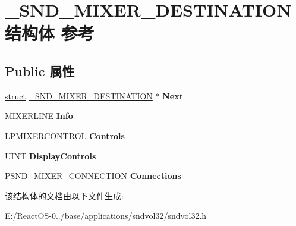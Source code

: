 \hypertarget{struct___s_n_d___m_i_x_e_r___d_e_s_t_i_n_a_t_i_o_n}{}\section{\+\_\+\+S\+N\+D\+\_\+\+M\+I\+X\+E\+R\+\_\+\+D\+E\+S\+T\+I\+N\+A\+T\+I\+O\+N结构体 参考}
\label{struct___s_n_d___m_i_x_e_r___d_e_s_t_i_n_a_t_i_o_n}
\subsection*{Public 属性}
\begin{DoxyCompactItemize}
\item 
\mbox{\label{struct___s_n_d___m_i_x_e_r___d_e_s_t_i_n_a_t_i_o_n_a4ad892b60f36f6779ee070a9ad213b46}} 
\hyperlink{interfacestruct}{struct} \hyperlink{struct___s_n_d___m_i_x_e_r___d_e_s_t_i_n_a_t_i_o_n}{\+\_\+\+S\+N\+D\+\_\+\+M\+I\+X\+E\+R\+\_\+\+D\+E\+S\+T\+I\+N\+A\+T\+I\+ON} $\ast$ {\bfseries Next}
\item 
\mbox{\label{struct___s_n_d___m_i_x_e_r___d_e_s_t_i_n_a_t_i_o_n_aca2514b644de46385f0bb59deeb73cd8}} 
\hyperlink{structtag_m_i_x_e_r_l_i_n_e_a}{M\+I\+X\+E\+R\+L\+I\+NE} {\bfseries Info}
\item 
\mbox{\label{struct___s_n_d___m_i_x_e_r___d_e_s_t_i_n_a_t_i_o_n_a02c4f4b3ea4935bb3aa35de07b2a200f}} 
\hyperlink{structtag_m_i_x_e_r_c_o_n_t_r_o_l_a}{L\+P\+M\+I\+X\+E\+R\+C\+O\+N\+T\+R\+OL} {\bfseries Controls}
\item 
\mbox{\label{struct___s_n_d___m_i_x_e_r___d_e_s_t_i_n_a_t_i_o_n_aedf248652bb9312c7371f881c60b5339}} 
U\+I\+NT {\bfseries Display\+Controls}
\item 
\mbox{\label{struct___s_n_d___m_i_x_e_r___d_e_s_t_i_n_a_t_i_o_n_a54f6f45a352ce1783a020c6503927f8c}} 
\hyperlink{struct___s_n_d___m_i_x_e_r___c_o_n_n_e_c_t_i_o_n}{P\+S\+N\+D\+\_\+\+M\+I\+X\+E\+R\+\_\+\+C\+O\+N\+N\+E\+C\+T\+I\+ON} {\bfseries Connections}
\end{DoxyCompactItemize}


该结构体的文档由以下文件生成\+:\begin{DoxyCompactItemize}
\item 
E\+:/\+React\+O\+S-\/0../base/applications/sndvol32/sndvol32.\+h\end{DoxyCompactItemize}
